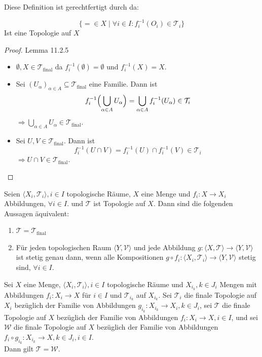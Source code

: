 Diese Definition ist gerechtfertigt durch da:

\mlenma{}
{
    $$\{=\in X\mid \forall i \in I: f_i^{-1}(O_i) \in \mathcal{T}_i \}$$ Ist eine Topologie auf $X$
}

\begin{proof}{Lemma 11.2.5}
    \begin{itemize}
        \item[$\bullet$] $\emptyset, X \in \mathcal{T}_{\text{final}}$ da $f_i^{-1}(\emptyset) = \emptyset$ und 
        $f_i^{-1}(X) = X$.
        \item[$\bullet$] Sei $(U_\alpha)_{\alpha \in A} \subseteq \mathcal{T}_{\text{final}}$ eine Familie.
        Dann ist 
        $$
        f_i^{-1}\Bigl(\bigcup_{\alpha \in A} U_\alpha\Bigr)
        = \bigcup_{\alpha \in A} f_i^{-1}(U_\alpha) \in \mathcal{T}_i
        $$
        $\Rightarrow \bigcup_{\alpha \in A} U_\alpha \in \mathcal{T}_{\text{final}}$.
        \item[$\bullet$] Sei $U, V \in \mathcal{T}_{\text{final}}$. Dann ist 
        $$
        f_i^{-1}(U \cap V) = f_i^{-1}(U) \cap f_i^{-1}(V) \in \mathcal{T}_i
        $$
        $\Rightarrow U \cap V \in \mathcal{T}_{\text{final}}$.
    \end{itemize}
\end{proof}
{
    Seien $\langle X_i,\mathcal{T}_i \rangle,  i \in I$ topologische Räume, $X$ eine Menge und 
    $f_i: X \to X_i$ Abbildungen, $\forall i \in I$. und $\mathcal{T}$ ist Topologie auf $X$.
    Dann sind die folgenden Aussagen äquivalent:
    \begin{enumerate}
        \item[(i)] $\mathcal{T} = \mathcal{T}_{\text{final}}$
        \item[(ii)] Für jeden topologischen Raum $\langle Y, \mathcal{V} \rangle$ und jede Abbildung 
        $g: \langle X, \mathcal{T} \rangle \to \langle Y, \mathcal{V} \rangle$ ist stetig genau dann, wenn alle Kompositionen 
        $g \circ f_i: \langle X_i, \mathcal{T}_i \rangle \to \langle Y, \mathcal{V} \rangle$ stetig sind, $\forall i \in I$.
    \end{enumerate}
}
\thm{}
{
    Sei $X$ eine Menge, $\langle X_i, \mathcal{T}_i \rangle, i \in I$ topologische Räume und 
    $X_{i_k}, k\in J_i $ Mengen mit Abbildungen $f_i: X_i \to X$ für $i \in I$ und $\mathcal{T}_{i_k}$ auf 
    $X_{i_k}$. 
    Sei $\mathcal{T}_i$ die finale Topologie auf $X_i$ bezüglich der Familie von Abbildungen
    $g_{i_k}: X_{i_k} \to X_i, k \in J_i$,
    sei $\mathcal{T}$ die finale Topologie auf $X$ bezüglich der Familie von Abbildungen 
    $f_i: X_i \to X, i \in I$,
    und sei $\mathcal{W}$ die finale Topologie auf $X$ bezüglich der Familie von Abbildungen 
    $f_i \circ g_{i_k}: X_{i_k} \to X, k \in J_i, i \in I$.
    \\
    Dann gilt $\mathcal{T} = \mathcal{W}$.
}

